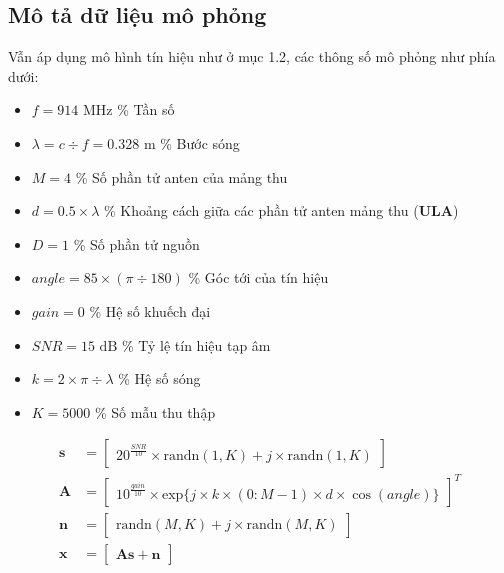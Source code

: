 \subsection{Mô tả dữ liệu mô phỏng}
Vẫn áp dụng mô hình tín hiệu như ở mục 1.2, các thông số mô phỏng như phía dưới:
{\renewcommand\labelitemi{}
\begin{itemize}
           \item $f = 914\textrm{ MHz}$                \hspace{1.6cm}\% Tần số
	\item $\lambda = c \div f = 0.328\textrm{ m}$	\hspace{0.4cm}\% Bước sóng
	\item $M = 4$				\hspace{2.88cm}\% Số phần tử anten của mảng thu
	\item $d = 0.5 \times \lambda$		\hspace{2.1cm}\% Khoảng cách giữa các phần tử anten mảng thu (\textbf{ULA})
	\item $D = 1$				\hspace{2.95cm}\% Số phần tử nguồn
	\item $angle = 85 \times (\pi \div 180)$ \% Góc tới của tín hiệu
	\item $gain = 0$				\hspace{2.5cm}\% Hệ số khuếch đại
	\item $SNR = 15\textrm{ dB}$			\hspace{1.5cm}\% Tỷ lệ tín hiệu tạp âm
	\item $k = 2 \times \pi \div \lambda$	\hspace{1.56cm}\% Hệ số sóng
	\item $K = 5000$				\hspace{2.3cm}\% Số mẫu thu thập
\end{itemize}
\begin{subequations}
\label{eq:all}
\begin{align}
\label{eq:model_a}
    \mathbf{s} &=
    \begin{bmatrix}
   	20^{\frac{SNR}{10}}\times \mathrm{randn}(1, K) + j \times \mathrm{randn}(1, K)
    \end{bmatrix}\\
\label{eq:model_b}
    \mathbf{A} &=
    \begin{bmatrix}
	10^{\frac{gain}{10}} \times \mathrm{exp}\{j \times k \times (0:M-1) \times d \times \cos(angle)\}
    \end{bmatrix}^T \\
\label{eq:model_c}
 \mathbf{n} &=
    \begin{bmatrix}
	\mathrm{randn}(M, K) + j \times \mathrm{randn}(M, K)
    \end{bmatrix} \\
\label{eq:model_d}
 \mathbf{x} &=
    \begin{bmatrix}
	\mathbf{A}\mathbf{s} + \mathbf{n}
    \end{bmatrix}
\end{align}
\end{subequations}

}
